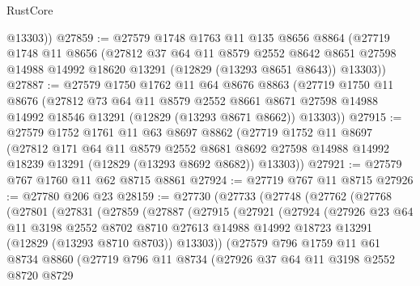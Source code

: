 \begin{lexlean}{RustCore}
\begin{coremodule}
        @13303))
@27859 := @27579
    @1748
    @1763
    @11
    @135
    @8656
    @8864
    (@27719
      @1748
      @11
      @8656
      (@27812
        @37
        @64
        @11
        @8579
        @2552
        @8642
        @8651
        @27598
        @14988
        @14992
        @18620
        @13291
        (@12829 (@13293 @8651 @8643))
        @13303))
@27887 := @27579
    @1750
    @1762
    @11
    @64
    @8676
    @8863
    (@27719
      @1750
      @11
      @8676
      (@27812
        @73
        @64
        @11
        @8579
        @2552
        @8661
        @8671
        @27598
        @14988
        @14992
        @18546
        @13291
        (@12829 (@13293 @8671 @8662))
        @13303))
@27915 := @27579
    @1752
    @1761
    @11
    @63
    @8697
    @8862
    (@27719
      @1752
      @11
      @8697
      (@27812
        @171
        @64
        @11
        @8579
        @2552
        @8681
        @8692
        @27598
        @14988
        @14992
        @18239
        @13291
        (@12829 (@13293 @8692 @8682))
        @13303))
@27921 := @27579 @767 @1760 @11 @62 @8715 @8861
@27924 := @27719 @767 @11 @8715
@27926 := @27780 @206 @23
@28159 := @27730
    (@27733
      (@27748
        (@27762
          (@27768
            (@27801
              (@27831
                (@27859
                  (@27887
                    (@27915
                      (@27921
                        (@27924
                          (@27926
                            @23
                            @64
                            @11
                            @3198
                            @2552
                            @8702
                            @8710
                            @27613
                            @14988
                            @14992
                            @18723
                            @13291
                            (@12829 (@13293 @8710 @8703))
                            @13303))
                        (@27579
                          @796
                          @1759
                          @11
                          @61
                          @8734
                          @8860
                          (@27719
                            @796
                            @11
                            @8734
                            (@27926
                              @37
                              @64
                              @11
                              @3198
                              @2552
                              @8720
                              @8729

\end{coremodule}
\end{lexlean}
